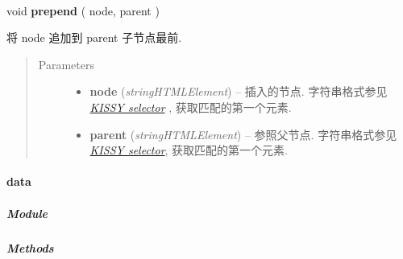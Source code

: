 \documentclass[letterpaper,10pt,english]{sphinxmanual}
\begin{document}
\begin{fulllineitems}
\label{api/core/dom/prepend:DOM.prepend}~
\begin{DUlineblock}{0em}
\item[] void \textbf{prepend} ( node, parent )
\item[] 将 node 追加到 parent 子节点最前.
\end{DUlineblock}
\begin{quote}\begin{description}
\item[{Parameters}] \leavevmode\begin{itemize}
\item {}
\textbf{node} (\emph{string\textbar{}HTMLElement}) -- 插入的节点. 字符串格式参见 {\hyperref[api/core/dom/selector:dom-selector]{\emph{KISSY selector}}} , 获取匹配的第一个元素.

\item {}
\textbf{parent} (\emph{string\textbar{}HTMLElement}) -- 参照父节点. 字符串格式参见 {\hyperref[api/core/dom/selector:dom-selector]{\emph{KISSY selector}}}, 获取匹配的第一个元素.

\end{itemize}

\end{description}\end{quote}

\end{fulllineitems}



\paragraph{data}
\label{api/core/dom/data:data}\label{api/core/dom/data::doc}

\subparagraph{Module}
\label{api/core/dom/data:module}\begin{quote}

{\hyperref[api/core/dom/index:module-DOM]{}}
\end{quote}


\subparagraph{Methods}
\label{api/core/dom/data:methods}
\end{document}
